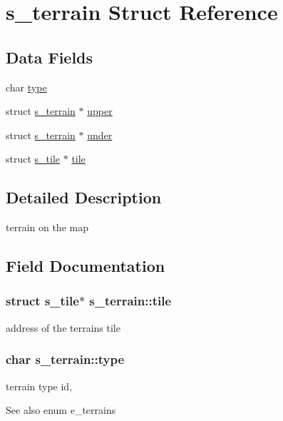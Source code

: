 \hypertarget{structs__terrain}{}\section{s\+\_\+terrain Struct Reference}
\label{structs__terrain}
\subsection*{Data Fields}
\begin{DoxyCompactItemize}
\item 
char \hyperlink{structs__terrain_a82ece7bf8af257bb0641dd47e1093358}{type}
\item 
struct \hyperlink{structs__terrain}{s\+\_\+terrain} $\ast$ \hyperlink{structs__terrain_ac12bffa573ce425f612f6ce99b4b4f0f}{upper}
\item 
struct \hyperlink{structs__terrain}{s\+\_\+terrain} $\ast$ \hyperlink{structs__terrain_a68c60ddeb2843fde86c0a312acf376de}{under}
\item 
struct \hyperlink{structs__tile}{s\+\_\+tile} $\ast$ \hyperlink{structs__terrain_a3a4de338e5269cfd5de4acd86dff5492}{tile}
\end{DoxyCompactItemize}


\subsection{Detailed Description}
terrain on the map 

\subsection{Field Documentation}
\subsubsection[{\texorpdfstring{tile}{tile}}]{\setlength{\rightskip}{0pt plus 5cm}struct {\bf s\+\_\+tile}$\ast$ s\+\_\+terrain\+::tile}\hypertarget{structs__terrain_a3a4de338e5269cfd5de4acd86dff5492}{}\label{structs__terrain_a3a4de338e5269cfd5de4acd86dff5492}
address of the terrain\textquotesingle{}s tile 
\subsubsection[{\texorpdfstring{type}{type}}]{\setlength{\rightskip}{0pt plus 5cm}char s\+\_\+terrain\+::type}\hypertarget{structs__terrain_a82ece7bf8af257bb0641dd47e1093358}{}\label{structs__terrain_a82ece7bf8af257bb0641dd47e1093358}
terrain type id, \begin{DoxySeeAlso}{See also}
enum e\+\_\+terrains 
\end{DoxySeeAlso}
